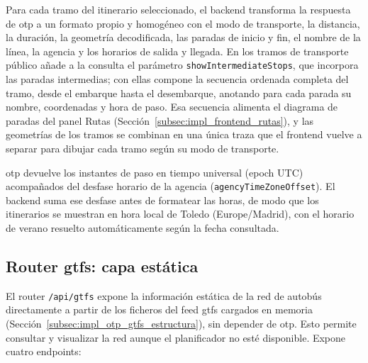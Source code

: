 Para cada tramo del itinerario seleccionado, el backend transforma la respuesta de \gls{otp} a un formato propio y homogéneo con el modo de transporte, la distancia, la duración, la geometría decodificada, las paradas de inicio y fin, el nombre de la línea, la agencia y los horarios de salida y llegada. En los tramos de transporte público añade a la consulta el parámetro \texttt{showIntermediateStops}, que incorpora las paradas intermedias; con ellas compone la secuencia ordenada completa del tramo, desde el embarque hasta el desembarque, anotando para cada parada su nombre, coordenadas y hora de paso. Esa secuencia alimenta el diagrama de paradas del panel Rutas (Sección~\ref{subsec:impl_frontend_rutas}), y las geometrías de los tramos se combinan en una única traza que el frontend vuelve a separar para dibujar cada tramo según su modo de transporte.

\gls{otp} devuelve los instantes de paso en tiempo universal (epoch UTC) acompañados del desfase horario de la agencia (\texttt{agencyTimeZoneOffset}). El backend suma ese desfase antes de formatear las horas, de modo que los itinerarios se muestran en hora local de Toledo (Europe/Madrid), con el horario de verano resuelto automáticamente según la fecha consultada.

\subsection[Router GTFS: capa estática]{Router \gls{gtfs}: capa estática}
\label{subsec:impl_backend_gtfs}

El router \texttt{/api/gtfs} expone la información estática de la red de autobús directamente a partir de los ficheros del feed \gls{gtfs} cargados en memoria (Sección~\ref{subsec:impl_otp_gtfs_estructura}), sin depender de \gls{otp}. Esto permite consultar y visualizar la red aunque el planificador no esté disponible. Expone cuatro endpoints:

